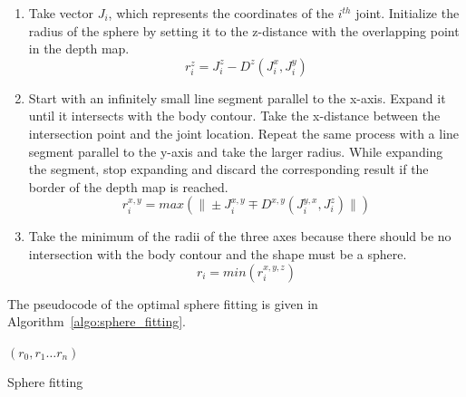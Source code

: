 \documentclass[number,preprint,review,12pt]{elsarticle}
\begin{document}
\begin{enumerate}
\item Take vector $J_i$, which represents the coordinates of the $i^{th}$ joint.
Initialize the radius of the sphere by setting it to the z-distance with the overlapping point in the depth map.
\begin{equation}
r_i^z=J_i^z-D^z(J_i^x,J_i^y)
\label{eqn:z_sphere_radius}
\end{equation}
\item Start with an infinitely small line segment parallel to the x-axis. Expand it until it intersects with the body contour. Take the x-distance between the intersection point and the joint location. Repeat the same process with a line segment parallel to the y-axis and take the larger radius. While expanding the segment, stop expanding and discard the corresponding result if the border of the depth map is reached.
\begin{equation}
r_i^{x,y}=max(\| \pm J_i^{x,y} \mp D^{x,y}(J_i^{y,x},J_i^z)\|)
\label{eqn:x_y_sphere_radius}
\end{equation}
\item Take the minimum of the radii of the three axes because there should be no intersection with the body contour and the shape must be a sphere.
\begin{equation}
r_i=min(r_i^{x,y,z})
\label{eqn:minimum_sphere-radius}
\end{equation}
\end{enumerate}

\noindent The pseudocode of the optimal sphere fitting is given in Algorithm~\ref{algo:sphere_fitting}.

\singlespacing

\begin{algorithm}
\DontPrintSemicolon 
{}
\Return $(r_0,r_1 \ldots r_n)$ 
\caption{Sphere fitting}
\label{algo:sphere_fitting}
\end{algorithm}  
\end{document}
